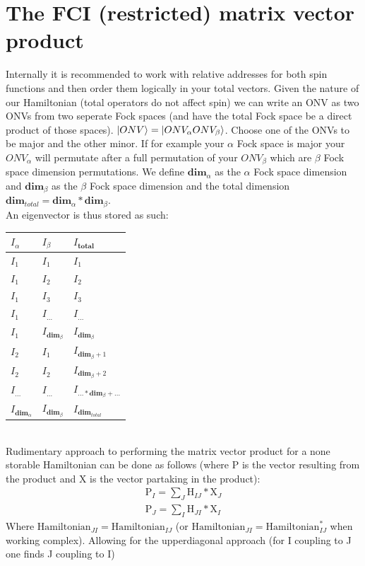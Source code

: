 \documentclass[12p]{article}
\begin{document}
\section{The FCI (restricted) matrix vector product}

Internally it is recommended to work with relative addresses for both spin functions and then order them logically in your total vectors. Given the nature of our Hamiltonian (total operators do not affect spin) we can write an ONV as two ONVs from two seperate Fock spaces (and have the total Fock space be a direct product of those spaces). $\ket{ONV} = \ket{ONV_\alpha ONV_\beta}$. Choose one of the ONVs to be major and the other minor. If for example your $\alpha$ Fock space is major your $ONV_\alpha$ will permutate after a full permutation of your $ONV_\beta$ which are $\beta$ Fock space dimension permutations.
We define $\textbf{dim}_\alpha$ as the $\alpha$ Fock space dimension and $\textbf{dim}_\beta$ as the $\beta$ Fock space dimension and the total dimension $\textbf{dim}_{total} = \textbf{dim}_\alpha * \textbf{dim}_\beta$. \\
An eigenvector is thus stored as such:
\begin{tabular}{|l|l||l|}
\hline
$I_{\alpha}$ & $I_{\beta}$ & $I_{\textbf{total}}$ \\ \hline
$I_1$ & $I_1$ & $I_1$ \\ \hline
$I_1$ & $I_2$ & $I_2$ \\ \hline
$I_1$ & $I_3$ & $I_3$ \\ \hline
$I_1$ & $I_{...}$ & $I_{...}$ \\ \hline
$I_1$ & $I_{\textbf{dim}_\beta}$ & $I_{\textbf{dim}_\beta}$ \\ \hline
$I_2$ & $I_{1}$ & $I_{\textbf{dim}_\beta + 1}$ \\ \hline
$I_2$ & $I_{2}$ & $I_{\textbf{dim}_\beta + 2}$ \\ \hline
$I_{...}$ & $I_{...}$ & $I_{... * \textbf{dim}_\beta + ...}$ \\ \hline
$I_{\textbf{dim}_\alpha}$ & $I_{\textbf{dim}_\beta}$ & $I_{\textbf{dim}_{total}}$ \\ \hline
\end{tabular}
\\
Rudimentary approach to performing the matrix vector product for a none storable Hamiltonian can be done as follows (where P is the vector resulting from the product and X is the vector partaking in the product):
\begin{align}
  \text{P}_{I} = \sum_J \text{H}_{IJ} * \text{X}_{J} \\
  \text{P}_{J} = \sum_I \text{H}_{JI} * \text{X}_{I}
\end{align}
Where $\text{Hamiltonian}_{JI} = \text{Hamiltonian}_{IJ}$ (or $\text{Hamiltonian}_{JI} = \text{Hamiltonian}_{IJ}^*$ when working complex). Allowing for the upperdiagonal approach (for I coupling to J one finds J coupling to I)
\end{document}
